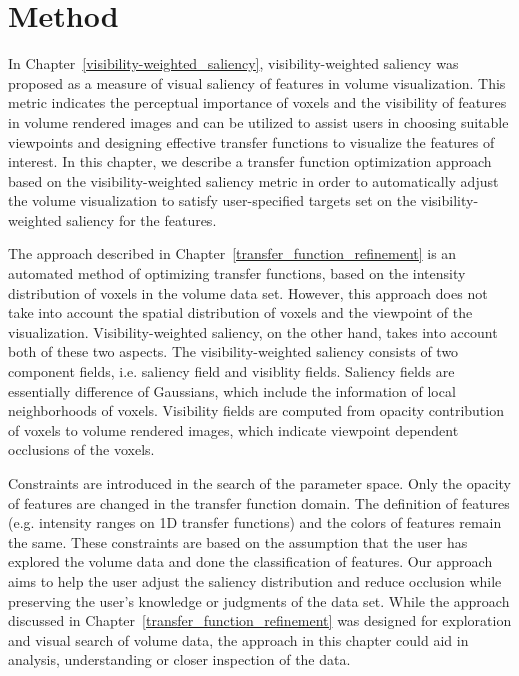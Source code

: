 \section{Method}
In Chapter~\ref{visibility-weighted_saliency}, visibility-weighted saliency was proposed as a measure of visual saliency of features in volume visualization. This metric indicates the perceptual importance of voxels and the visibility of features in volume rendered images and can be utilized to assist users in choosing suitable viewpoints and designing effective transfer functions to visualize the features of interest.
In this chapter, we describe a transfer function optimization approach based on the visibility-weighted saliency metric in order to automatically adjust the volume visualization to satisfy user-specified targets set on the visibility-weighted saliency for the features.

The approach described in Chapter~\ref{transfer_function_refinement} is an automated method of optimizing transfer functions, based on the intensity distribution of voxels in the volume data set. However, this approach does not take into account the spatial distribution of voxels and the viewpoint of the visualization. Visibility-weighted saliency, on the other hand, takes into account both of these two aspects. The visibility-weighted saliency consists of two component fields, i.e. saliency field and visiblity fields. Saliency fields are essentially difference of Gaussians, which include the information of local neighborhoods of voxels.
Visibility fields are computed from opacity contribution of voxels to volume rendered images, which indicate viewpoint dependent occlusions of the voxels.

Constraints are introduced in the search of the parameter space. Only the opacity of features are changed in the transfer function domain. The definition of features (e.g. intensity ranges on 1D transfer functions) and the colors of features remain the same.
These constraints are based on the assumption that the user has explored the volume data and done the classification of features.
Our approach aims to help the user adjust the saliency distribution and reduce occlusion while preserving the user's knowledge or judgments of the data set.
While the approach discussed in Chapter~\ref{transfer_function_refinement} was designed for exploration and visual search of volume data, the approach in this chapter could aid in analysis, understanding or closer inspection of the data.

